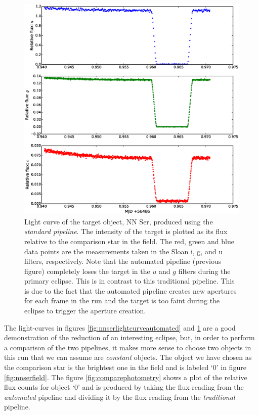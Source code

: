 \begin{figure}
\centering
\includegraphics[width=140mm]{images/nnser_lightcurve_tom.eps}
\caption{Light curve of the target object, NN Ser, produced using the \emph{standard pipeline}. The intensity of the target is plotted as its flux relative to the comparison star in the field. The red, green and blue data points are the measurements taken in the Sloan i, g, and u filters, respectively. Note that the automated pipeline (previous figure) completely loses the target in the $u$ and $g$ filters during the primary eclipse. This is in contrast to this traditional pipeline. This is due to the fact that the automated pipeline creates new apertures for each frame in the run and the target is too faint during the eclipse to trigger the aperture creation.}
\label{fig:nnserlightcurvetom}
\end{figure}

The light-curves in figures \ref{fig:nnserlightcurveautomated} and \ref{fig:nnserlightcurvetom} are a good demonstration of the reduction of an interesting eclipse, but, in order to perform a comparison of the two pipelines, it makes more sense to choose two objects in this run that we can assume are \emph{constant} objects. The object we have chosen as the comparison star is the brightest one in the field and is labeled `0' in figure \ref{fig:nnserfield}. The figure \ref{fig:comparephotometry} shows a plot of the relative flux counts for object `0' and is produced by taking the flux reading from the \emph{automated} pipeline and dividing it by the flux reading from the \emph{traditional} pipeline. 

